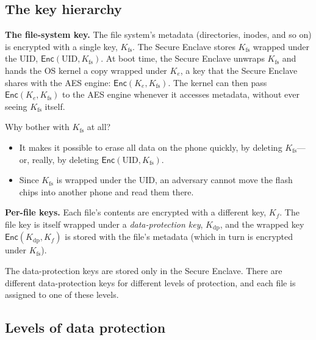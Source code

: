 \documentclass[
  letterpaper,
]{scrbook}
\providecommand{\tightlist}{%
  \setlength{\itemsep}{0pt}\setlength{\parskip}{0pt}}
\theoremstyle{definition}
\theoremstyle{plain}
\theoremstyle{plain}
\theoremstyle{remark}
\begin{document}
\subsection{The key hierarchy}\label{the-key-hierarchy}

\textbf{The file-system key.} The file system's metadata (directories,
inodes, and so on) is encrypted with a single key, \(K_\text{fs}\). The
Secure Enclave stores \(K_\text{fs}\) wrapped under the UID,
\(\mathsf{Enc}(\text{UID}, K_\text{fs})\). At boot time, the Secure
Enclave unwraps \(K_\text{fs}\) and hands the OS kernel a copy wrapped
under \(K_e\), a key that the Secure Enclave shares with the AES engine:
\(\mathsf{Enc}(K_e, K_\text{fs})\). The kernel can then pass
\(\mathsf{Enc}(K_e, K_\text{fs})\) to the AES engine whenever it
accesses metadata, without ever seeing \(K_\text{fs}\) itself.

Why bother with \(K_\text{fs}\) at all?

\begin{itemize}
\tightlist
\item
  It makes it possible to erase all data on the phone quickly, by
  deleting \(K_\text{fs}\)---or, really, by deleting
  \(\mathsf{Enc}(\text{UID}, K_\text{fs})\).
\item
  Since \(K_\text{fs}\) is wrapped under the UID, an adversary cannot
  move the flash chips into another phone and read them there.
\end{itemize}

\textbf{Per-file keys.} Each file's contents are encrypted with a
different key, \(K_f\). The file key is itself wrapped under a
\emph{data-protection key}, \(K_\text{dp}\), and the wrapped key
\(\mathsf{Enc}(K_\text{dp}, K_f)\) is stored with the file's metadata
(which in turn is encrypted under \(K_\text{fs}\)).


The data-protection keys are stored only in the Secure Enclave. There
are different data-protection keys for different levels of protection,
and each file is assigned to one of these levels.

\subsection{Levels of data protection}\label{levels-of-data-protection}
\end{document}
